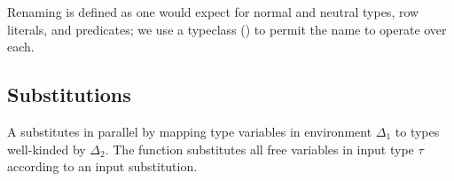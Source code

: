 \documentclass[sigplan,screen]{acmart}
\begin{document}
Renaming is defined as one would expect for normal and neutral types, row literals, and predicates; we use a typeclass () to permit the name  to operate over each.

\subsection{Substitutions} 

A  substitutes in parallel by mapping type variables in environment $\Delta_1$ to types well-kinded by $\Delta_2$. The function  substitutes all free variables in input type $\tau$ according to an input substitution.

\begin{AgdaAlign}
\begin{code}[hide]%
\>[0]\AgdaSpace{}%
\AgdaSpace{}%
\<%
\\
\>[0][@{}l@{\AgdaIndent{0}}]%
\>[2]\AgdaSpace{}%
\AgdaSpace{}%
\<%
\\
%
\>[2]\AgdaSpace{}%
\AgdaSpace{}%
\<%
\\
%
\>[2]\AgdaSpace{}%
\AgdaSpace{}%
\<%
\\
%
\>[2]\AgdaSpace{}%
\AgdaSpace{}%
\<%
\end{code}
\begin{code}%
%
\>[2]\AgdaSpace{}%
\AgdaSymbol{:}\AgdaSpace{}%
\AgdaSpace{}%
\AgdaSpace{}%
\AgdaSpace{}%
\AgdaSpace{}%
\<%
\\
%
\>[2]\AgdaSpace{}%
\AgdaSpace{}%
\AgdaSpace{}%
\AgdaSymbol{=}\AgdaSpace{}%
\AgdaSpace{}%
\AgdaSymbol{\{}\AgdaSymbol{\}}\AgdaSpace{}%
\AgdaSpace{}%
\AgdaSpace{}%
\AgdaSpace{}%
\AgdaSpace{}%
\AgdaSpace{}%
\AgdaSpace{}%
\AgdaSpace{}%
\<%
\\
%
\>[2]\AgdaSpace{}%

\end{code}
\end{AgdaAlign}
\end{document}

